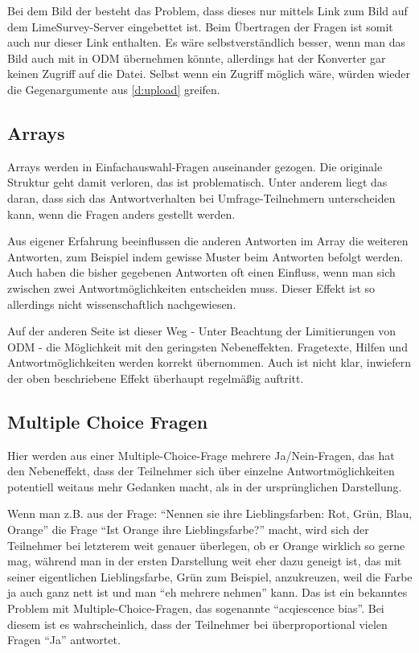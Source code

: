 Bei dem Bild der  besteht das Problem, dass dieses nur mittels Link zum Bild auf dem LimeSurvey-Server eingebettet ist.
Beim Übertragen der Fragen ist somit auch nur dieser Link enthalten.
Es wäre selbstverständlich besser, wenn man das Bild auch mit in ODM übernehmen könnte, allerdings hat der Konverter gar keinen Zugriff auf die Datei.
Selbst wenn ein Zugriff möglich wäre, würden wieder die Gegenargumente aus \cref{d:upload} greifen.

\subsection{Arrays}

Arrays werden in Einfachauswahl-Fragen auseinander gezogen.
Die originale Struktur geht damit verloren, das ist problematisch.
Unter anderem liegt das daran, dass sich das Antwortverhalten bei Umfrage-Teilnehmern unterscheiden kann, wenn die Fragen anders gestellt werden.

Aus eigener Erfahrung beeinflussen die anderen Antworten im Array die weiteren Antworten, zum Beispiel indem gewisse Muster beim Antworten befolgt werden.
Auch haben die bisher gegebenen Antworten oft einen Einfluss, wenn man sich zwischen zwei Antwortmöglichkeiten entscheiden muss.
Dieser Effekt ist so allerdings nicht wissenschaftlich nachgewiesen.

Auf der anderen Seite ist dieser Weg - Unter Beachtung der Limitierungen von ODM - die Möglichkeit mit den geringsten Nebeneffekten.
Fragetexte, Hilfen und Antwortmöglichkeiten werden korrekt übernommen.
Auch ist nicht klar, inwiefern der oben beschriebene Effekt überhaupt regelmäßig auftritt.

\subsection{Multiple Choice Fragen}

Hier werden aus einer Multiple-Choice-Frage mehrere Ja/Nein-Fragen, das hat den Nebeneffekt, dass der Teilnehmer sich über einzelne Antwortmöglichkeiten potentiell weitaus mehr Gedanken macht, als in der ursprünglichen Darstellung.

Wenn man z.B. aus der Frage: \enquote{Nennen sie ihre Lieblingsfarben: Rot, Grün, Blau, Orange} die Frage \enquote{Ist Orange ihre Lieblingsfarbe?} macht, 
wird sich der Teilnehmer bei letzterem weit genauer überlegen, ob er Orange wirklich so gerne mag, während man in der ersten Darstellung weit eher dazu geneigt ist, 
das mit seiner eigentlichen Lieblingsfarbe, Grün zum Beispiel, anzukreuzen, weil die Farbe ja auch ganz nett ist und man \enquote{eh mehrere nehmen} kann.
Das ist ein bekanntes Problem mit Multiple-Choice-Fragen, das sogenannte \enquote{acqiescence bias}\cite{acquiescence_bias}.
Bei diesem ist es wahrscheinlich, dass der Teilnehmer bei überproportional vielen Fragen \enquote{Ja} antwortet.

